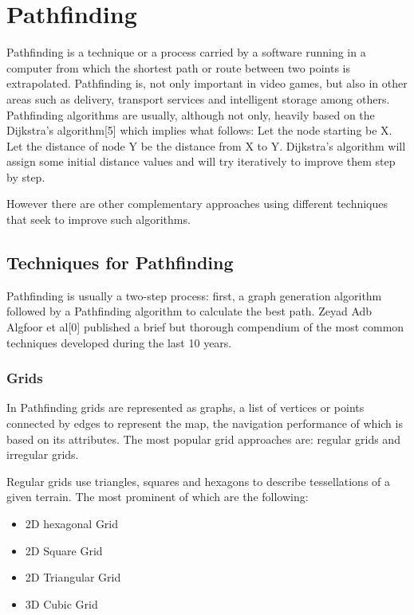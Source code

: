 \section{Pathfinding}

Pathfinding is a technique or a process carried by a software running in a computer from which the shortest path or route between two points is extrapolated. Pathfinding is, not only important in video games, but also in other areas such as delivery, transport services and intelligent storage among others. Pathfinding algorithms are usually, although not only, heavily based on the Dijkstra's algorithm[5] which implies what follows: Let the node starting be X. Let the distance of node Y be the distance from X to Y. Dijkstra's algorithm will assign some initial distance values and will try iteratively to improve them step by step.

\vspace{2mm}
However there are other complementary approaches using different techniques that seek to improve such algorithms.

\subsection{Techniques for Pathfinding}
Pathfinding is usually a two-step process: first, a graph generation algorithm followed by a Pathfinding algorithm to calculate the best path. Zeyad Adb Algfoor et al[0] published a brief but thorough compendium of the most common techniques developed during the last 10 years.


\subsubsection{Grids}
In Pathfinding grids are represented as graphs, a list of vertices or points connected by edges to represent the map, the navigation performance of which is based on its attributes. The most popular grid approaches are: regular grids and irregular grids.

\vspace{2mm}
Regular grids use triangles, squares and hexagons to describe tessellations of a given terrain. The most prominent of which are the following:

\begin{itemize}
	\item 2D hexagonal Grid
	\item 2D Square Grid
	\item 2D Triangular Grid
	\item 3D Cubic Grid
\end{itemize}

